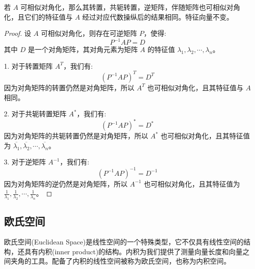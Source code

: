 \documentclass[a4paper,12pt]{ctexart}
\begin{document}
\begin{mythm}{}{}
    若 $A$ 可相似对角化，那么其转置，共轭转置，逆矩阵，伴随矩阵也可相似对角化，且它们的特征值与 $A$ 经过对应代数操纵后的结果相同。特征向量不变。
\end{mythm}
\begin{proof}
    设 $A$ 可相似对角化，则存在可逆矩阵 $P$，使得:
    \[
    P^{-1} A P = D
    \]
    其中 $D$ 是一个对角矩阵，其对角元素为矩阵 $A$ 的特征值 $\lambda_1, \lambda_2, \cdots, \lambda_n$。
    
    1. 对于转置矩阵 $A^T$，我们有:
    \[
    (P^{-1} A P)^T = D^T
    \]
    因为对角矩阵的转置仍然是对角矩阵，所以 $A^T$ 也可相似对角化，且其特征值与 $A$ 相同。
    
    2. 对于共轭转置矩阵 $A^*$，我们有:
    \[
    (P^{-1} A P)^* = D^*
    \]
    因为对角矩阵的共轭转置仍然是对角矩阵，所以 $A^*$ 也可相似对角化，且其特征值为 $\overline{\lambda_1}, \overline{\lambda_2}, \cdots, \overline{\lambda_n}$。
    
    3. 对于逆矩阵 $A^{-1}$，我们有:
    \[
    (P^{-1} A P)^{-1} = D^{-1}
    \]
    因为对角矩阵的逆仍然是对角矩阵，所以 $A^{-1}$ 也可相似对角化，且其特征值为 $\frac{1}{\lambda_1}, \frac{1}{\lambda_2}, \cdots, \frac{1}{\lambda_n}$。
\end{proof}

\newpage

\subsection{欧氏空间}

欧氏空间(Euclidean Space)是线性空间的一个特殊类型，它不仅具有线性空间的结构，还具有内积(inner product)的结构。内积为我们提供了测量向量长度和向量之间夹角的工具。配备了内积的线性空间被称为欧氏空间，也称为内积空间。
\end{document}
